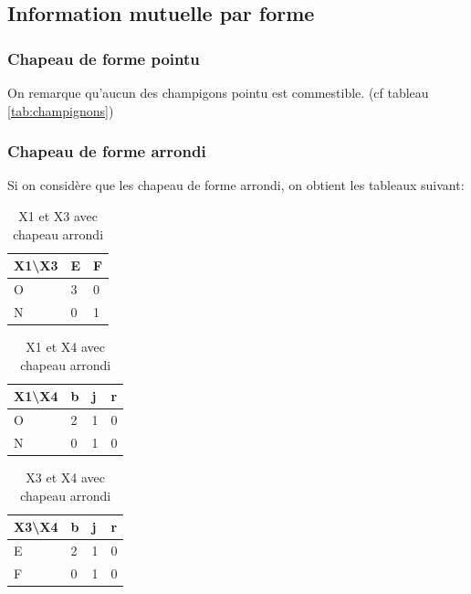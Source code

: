 \documentclass{article}
\begin{document}
    \subsection{Information mutuelle par forme}

    \subsubsection{Chapeau de forme pointu}
      On remarque qu'aucun des champigons pointu est commestible. (cf tableau \ref{tab:champignons})

\subsubsection{Chapeau de forme arrondi}

Si on considère que les chapeau de forme arrondi, on obtient les tableaux suivant: 

\begin{table}[H]
  \centering
  \caption{X1 et X3 avec chapeau arrondi}
  \begin{tabular}{|l|l|l|}
  \hline
  X1\textbackslash{}X3 & E & F \\ \hline
  O                    & 3 & 0 \\ \hline
  N                    & 0 & 1 \\ \hline
  \end{tabular}
  \end{table}

  \begin{table}[h]
    \centering
    \caption{X1 et X4 avec chapeau arrondi}
    \begin{tabular}{|l|l|l|l|}
    \hline
    X1\textbackslash{}X4 & b & j & r \\ \hline
    O                    & 2 & 1 & 0 \\ \hline
    N                    & 0 & 1 & 0 \\ \hline
    \end{tabular}
    \end{table}

    \begin{table}[H]
      \centering
      \caption{X3 et X4 avec chapeau arrondi}
      \begin{tabular}{|l|l|l|l|}
      \hline
      X3\textbackslash{}X4 & b & j & r \\ \hline
      E                    & 2 & 1 & 0 \\ \hline
      F                    & 0 & 1 & 0 \\ \hline
      \end{tabular}
      \end{table}
\end{document}
